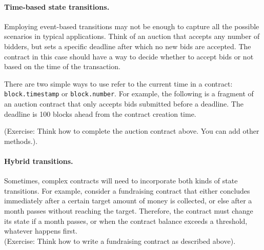 \documentclass[10pt,twocolumn,letterpaper]{article}
\begin{document}
\paragraph{Time-based state transitions.}
Employing event-based transitions may not be enough to capture all the possible scenarios in typical applications. Think of an auction that accepts any number of bidders, but sets a specific deadline after which no new bids are accepted. The contract in this case should have a way to decide whether to accept bids or not based on the time of the transaction.

There are two simple ways to use refer to the current time in a contract: \texttt{block.timestamp} or \texttt{block.number}. For example, the following is a fragment of an auction contract that only accepts bids submitted before a deadline. The deadline is 100 blocks ahead from the contract creation time.


(Exercise: Think how to complete the auction contract above. You can add other methods.).

\paragraph{Hybrid transitions.}
Sometimes, complex contracts will need to incorporate both kinds of state transitions. For example, consider a fundraising contract that either concludes immediately after a certain target amount of money is collected, or else after a month passes without reaching the target. Therefore, the contract must change its state if a month passes, or when the contract balance exceeds a threshold, whatever happens first.\\

(Exercise: Think how to write a fundraising contract as described above).
\end{document}
